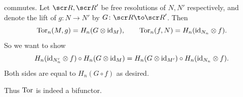     commutes.
    Let $\R,\R'$ be free resolutions of $N,N'$ respectively, and denote the lift of $g\colon N\to N'$ by $G\colon\R\to\R'$.
    Then
    $$ {\rm Tor}_n(M,g) = H_n(G\otimes{\rm id}_M),\qquad {\rm Tor}_n(f,N) = H_n({\rm id}_{N_n}\otimes f) . $$
    So we want to show
    $$ H_n({\rm id}_{N'_n}\otimes f)\circ H_n(G\otimes{\rm id}_M) = H_n(G\otimes{\rm id}_{M'}) \circ H_n({\rm id}_{N_n}\otimes f) . $$
    Both sides are equal to $H_n(G\circ f)$ as desired.

    Thus ${\rm Tor}$ is indeed a bifunctor.





